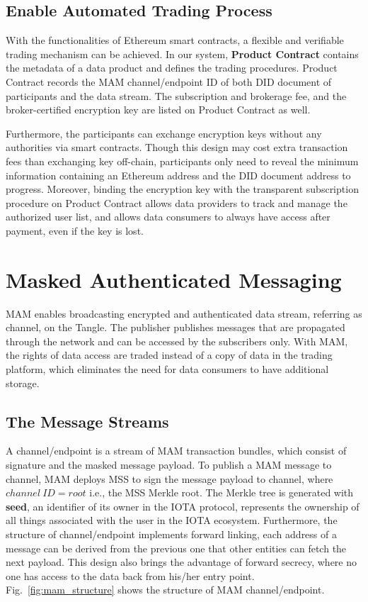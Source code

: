 \documentclass[conference]{IEEEtran}
\begin{document}
\subsection{Enable Automated Trading Process}
With the functionalities of Ethereum smart contracts, a flexible and verifiable trading mechanism can be achieved. In our system, \textbf{Product Contract} contains the metadata of a data product and defines the trading procedures. Product Contract records the MAM channel/endpoint ID of both DID document of participants and the data stream. The subscription and brokerage fee, and the broker-certified encryption key are listed on Product Contract as well. 

Furthermore, the participants can exchange encryption keys without any authorities via smart contracts. Though this design may cost extra transaction fees than exchanging key off-chain, participants only need to reveal the minimum information containing an Ethereum address and the DID document address to progress. Moreover, binding the encryption key with the transparent subscription procedure on Product Contract allows data providers to track and manage the authorized user list, and allows data consumers to always have access after payment, even if the key is lost.  

\section{Masked Authenticated Messaging}
\label{section:MAM}
MAM enables broadcasting encrypted and authenticated data stream, referring as channel, on the Tangle. The publisher publishes messages that are propagated through the network and can be accessed by the subscribers only. With MAM, the rights of data access are traded instead of a copy of data in the trading platform, which eliminates the need for data consumers to have additional storage. 

\subsection{The Message Streams}
A channel/endpoint is a stream of MAM transaction bundles, which consist of signature and the masked message payload. To publish a MAM message to channel, MAM deploys MSS to sign the message payload to channel, where $channel\ ID = root$ i.e., the MSS Merkle root. The Merkle tree is generated with \textbf{seed}, an identifier of its owner in the IOTA protocol, represents the ownership of all things associated with the user in the IOTA ecosystem. Furthermore, the structure of channel/endpoint implements forward linking, each address of a message can be derived from the previous one that other entities can fetch the next payload. This design also brings the advantage of forward secrecy, where no one has access to the data back from his/her entry point. Fig.~\ref{fig:mam_structure} shows the structure of MAM channel/endpoint.
\end{document}

